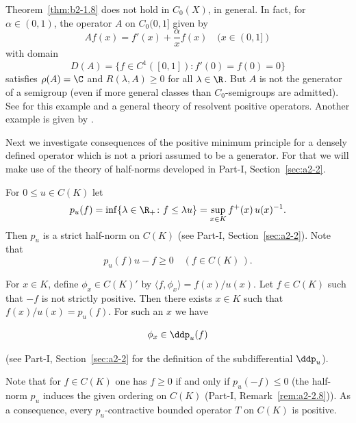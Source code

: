 \begin{remark*}\label{rem:b2-1.9-kgk2}
Theorem~\ref{thm:b2-1.8} does not hold in $C_{0}(X)$, in general.
In fact, for $\alpha \in (0,1)$,  the operator $A$ on $C_{0}(0,1]$ given by 
\[
    Af(x) = f'(x) + \frac{\alpha}{x} f(x) \quad (x \in (0,1])
\]
with domain 
\[
D(A) = \{f \in C^{1}([0,1]) \colon f'(0) = f(0) = 0\} 
\]
satisfies $\rho(A) = \C $ and 
$R(\lambda,A) \geq 0$ for all $\lambda \in \R$.
But $A$ is not the generator of a semigroup (even if more general classes than $C_{0}$-semigroups are admitted).
See \textcite{arendt:1987} 
for this example and a general theory of resolvent positive operators.
Another example is given by \textcite{battydavies:1983}.
\end{remark*}

Next we investigate consequences of the positive minimum principle for a densely defined operator which is not a priori assumed to be a generator.
For that we will make use of the theory of half-norms developed in Part-I, Section~\ref{sec:a2-2}.

For $0  \leq  u \in C(K)$ let
\begin{equation}\label{eq:b2-1.4}
p_{u}(f) = \inf\{\lambda \in \R_{+} \colon f \leq \lambda u\} = \sup_{x \in K} f^{+}(x)\,u(x)^{-1}.
\end{equation}
Then $p_{u}$ is a strict half-norm on $C(K)$ 
(see Part-I, Section~\ref{sec:a2-2}).
Note that
\begin{equation}\label{eq:b2-1.5}
p_{u}(f)u - f \geq 0 \quad (f \in C(K)\,).
\end{equation}

For $x \in K$, define $\phi_{x} \in C(K)'$ by $\langle f,\phi_{x} \rangle = f(x)/u(x)$.
Let $f \in C(K)$ such that $-f$ is not strictly positive.
Then there exists $x \in K$ such that $f(x)/u(x) = p_{u}(f)$.
For such an $x$ we have

\begin{equation}\label{eq:b2-1.6}
\phi_{x} \in \ddp_{u}(f)
\end{equation}


(see Part-I, Section~\ref{sec:a2-2} for the definition of the subdifferential $\ddp_{u}$).

Note that for $f \in C(K)$ one has $f \geq 0$ if and only if\/ $p_{u}(-f) \leq 0$ (\ie  the half-norm $p_{u}$ induces the given ordering on $C(K)$ (\cf Part-I, Remark~\ref{rem:a2-2.8})).
As a consequence, every $p_{u}$-contractive bounded operator $T$ on $C(K)$ is positive.

